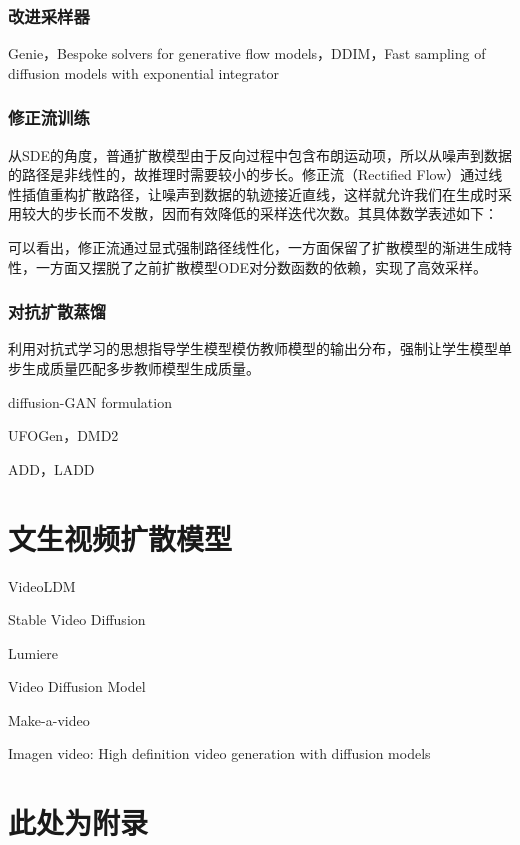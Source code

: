 \documentclass[11pt,a4paper,UTF8]{ctexart}
\begin{document}
\subsubsection{改进采样器}

Genie\cite{dockhorn2022genie}，Bespoke solvers for generative flow models\cite{shaul2023bespoke}，DDIM\cite{song2020denoising}，Fast sampling of diffusion models with exponential integrator\cite{zhang2022fast}

\subsubsection{修正流训练}

从SDE的角度，普通扩散模型由于反向过程中包含布朗运动项，所以从噪声到数据的路径是非线性的，故推理时需要较小的步长。修正流（Rectified Flow）\cite{liu2022flow}通过线性插值重构扩散路径，让噪声到数据的轨迹接近直线，这样就允许我们在生成时采用较大的步长而不发散，因而有效降低的采样迭代次数。其具体数学表述如下：


可以看出，修正流通过显式强制路径线性化，一方面保留了扩散模型的渐进生成特性，一方面又摆脱了之前扩散模型ODE对分数函数的依赖，实现了高效采样。

\subsubsection{对抗扩散蒸馏}

利用对抗式学习的思想指导学生模型模仿教师模型的输出分布，强制让学生模型单步生成质量匹配多步教师模型生成质量。

diffusion-GAN formulation\cite{wang2022diffusion,xiao2021tackling,xu2024semi}

UFOGen\cite{xu2024ufogen}，DMD2\cite{yin2024improved}

ADD\cite{sauer2024adversarial}，LADD\cite{sauer2024fast}



\section{文生视频扩散模型}

VideoLDM\cite{blattmann2023videoldm}

Stable Video Diffusion\cite{blattmann2023stable}

Lumiere\cite{bar2024lumiere}

\cite{esser2023structure}

Video Diffusion Model\cite{ho2022video}

Make-a-video\cite{singer2022make}

Imagen video: High definition video generation with diffusion models

\newpage


\newpage
\appendix


\section{此处为附录}
\end{document}
